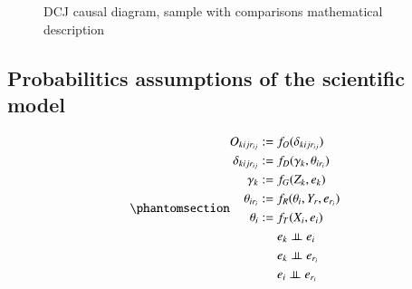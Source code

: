 \documentclass[
  authoryear,
  preprint,
  1p]{elsarticle}
\begin{document}
\begin{figure}


\caption{\label{fig-SciModel_samp}DCJ causal diagram, sample with
comparisons mathematical description}

\end{figure}%

\subsection{Probabilitics assumptions of the scientific
model}\label{sec-theory-probability}

\newcommand{\dsep}{\perp\!\!\!\perp}
\newcommand{\ndsep}{\not\!\perp\!\!\!\perp}

\begin{equation}\phantomsection\label{eq-StructuralModel}{
\begin{aligned}
  O_{kijr_{ij}} := & \; f_{O}( \delta_{kijr_{ij}} ) \\
  \delta_{kijr_{ij}} := & \; f_{D}( \gamma_{k}, \theta_{ir_{i}} ) \\
  \gamma_{k} := & \; f_{G}( Z_{k}, e_{k} ) \\
  \theta_{ir_{i}} := & \; f_{R}( \theta_{i}, Y_{r}, e_{r_{i}} ) \\
  \theta_{i} := & \; f_{T}( X_{i}, e_{i} ) \\
  & \; e_{k} \perp\!\!\!\perp e_{i} \\
  & \; e_{k} \perp\!\!\!\perp e_{r_{i}} \\
  & \; e_{i} \perp\!\!\!\perp e_{r_{i}}
\end{aligned}
}\end{equation}
\end{document}
